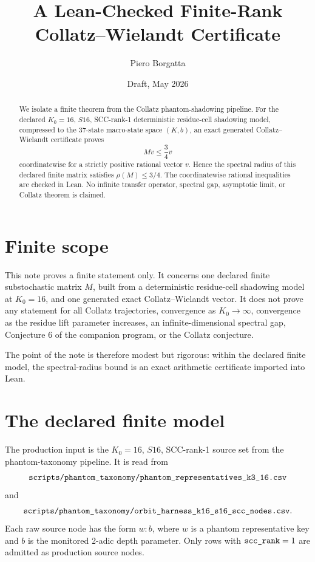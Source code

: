\documentclass[11pt,a4paper]{article}
\title{A Lean-Checked Finite-Rank Collatz--Wielandt Certificate}
\author{Piero Borgatta}
\date{Draft, May 2026}
\newcommand{\ttbr}[1]{\ifmmode\text{\texttt{\detokenize{#1}}}\else\texttt{\detokenize{#1}}\fi}
\begin{document}
\maketitle

\begin{abstract}
We isolate a finite theorem from the Collatz phantom-shadowing
pipeline.  For the declared \(K_0=16\), \(S16\), SCC-rank-1
deterministic residue-cell shadowing model, compressed to the
37-state macro-state space \((K,b)\), an exact generated
Collatz--Wielandt certificate proves
\[
  Mv \leq \frac34 v
\]
coordinatewise for a strictly positive rational vector \(v\).  Hence
the spectral radius of this declared finite matrix satisfies
\(\rho(M)\leq 3/4\).  The coordinatewise rational inequalities are
checked in Lean.  No infinite transfer operator, spectral gap,
asymptotic limit, or Collatz theorem is claimed.
\end{abstract}

\section{Finite scope}

This note proves a finite statement only.  It concerns one declared
finite substochastic matrix \(M\), built from a deterministic
residue-cell shadowing model at \(K_0=16\), and one generated exact
Collatz--Wielandt vector.  It does not prove any statement for all
Collatz trajectories, convergence as \(K_0\to\infty\), convergence as
the residue lift parameter increases, an infinite-dimensional spectral
gap, Conjecture 6 of the companion program, or the Collatz conjecture.

The point of the note is therefore modest but rigorous: within the
declared finite model, the spectral-radius bound is an exact arithmetic
certificate imported into Lean.

\section{The declared finite model}

The production input is the \(K_0=16\), \(S16\), SCC-rank-1 source set
from the phantom-taxonomy pipeline.  It is read from
\[
\ttbr{scripts/phantom_taxonomy/phantom_representatives_k3_16.csv}
\]
and
\[
\ttbr{scripts/phantom_taxonomy/orbit_harness_k16_s16_scc_nodes.csv}.
\]
Each raw source node has the form \(w:b\), where \(w\) is a phantom
representative key and \(b\) is the monitored 2-adic depth parameter.
Only rows with \(\ttbr{scc_rank}=1\) are admitted as production source
nodes.
\end{document}
